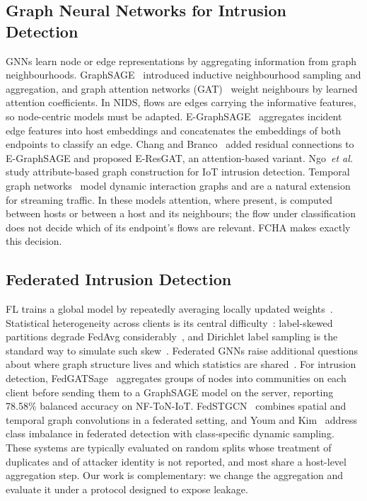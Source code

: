 \documentclass[journal]{IEEEtran}
\begin{document}
\subsection{Graph Neural Networks for Intrusion Detection}
GNNs learn node or edge representations by aggregating information from graph neighbourhoods. GraphSAGE~\cite{hamilton2017graphsage} introduced inductive neighbourhood sampling and aggregation, and graph attention networks (GAT)~\cite{velickovic2018gat} weight neighbours by learned attention coefficients. In NIDS, flows are edges carrying the informative features, so node-centric models must be adapted. E-GraphSAGE~\cite{lo2022egraphsage} aggregates incident edge features into host embeddings and concatenates the embeddings of both endpoints to classify an edge. Chang and Branco~\cite{chang2024eresgat} added residual connections to E-GraphSAGE and proposed E-ResGAT, an attention-based variant. Ngo~\emph{et al.}~\cite{ngo2025attribute} study attribute-based graph construction for IoT intrusion detection. Temporal graph networks~\cite{rossi2020tgn} model dynamic interaction graphs and are a natural extension for streaming traffic. In these models attention, where present, is computed between hosts or between a host and its neighbours; the flow under classification does not decide which of its endpoint's flows are relevant. FCHA makes exactly this decision.

\subsection{Federated Intrusion Detection}
FL trains a global model by repeatedly averaging locally updated weights~\cite{mcmahan2017fedavg}. Statistical heterogeneity across clients is its central difficulty~\cite{li2020flchallenges}: label-skewed partitions degrade FedAvg considerably~\cite{zhao2018noniid}, and Dirichlet label sampling is the standard way to simulate such skew~\cite{hsu2019noniid}. Federated GNNs raise additional questions about where graph structure lives and which statistics are shared~\cite{liu2024fedgnn}. For intrusion detection, FedGATSage~\cite{altfaily2025fedgatsage} aggregates groups of nodes into communities on each client before sending them to a GraphSAGE model on the server, reporting 78.58\% balanced accuracy on NF-ToN-IoT. FedSTGCN~\cite{wang2025fedstgcn} combines spatial and temporal graph convolutions in a federated setting, and Youm and Kim~\cite{youm2025sampling} address class imbalance in federated detection with class-specific dynamic sampling. These systems are typically evaluated on random splits whose treatment of duplicates and of attacker identity is not reported, and most share a host-level aggregation step. Our work is complementary: we change the aggregation and evaluate it under a protocol designed to expose leakage.
\end{document}

